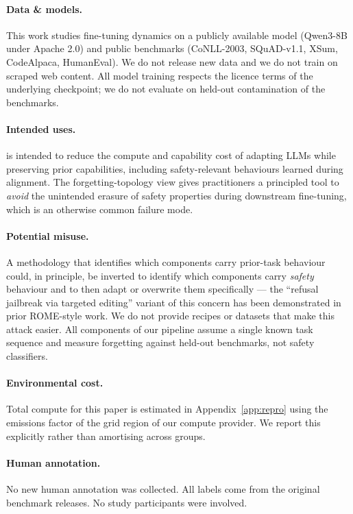 \paragraph{Data \& models.} This work studies fine-tuning dynamics on a publicly available model (Qwen3-8B under Apache 2.0) and public benchmarks (CoNLL-2003, SQuAD-v1.1, XSum, CodeAlpaca, HumanEval). We do not release new data and we do not train on scraped web content. All model training respects the licence terms of the underlying checkpoint; we do not evaluate on held-out contamination of the benchmarks.

\paragraph{Intended uses.} \tglora{} is intended to reduce the compute and capability cost of adapting LLMs while preserving prior capabilities, including safety-relevant behaviours learned during alignment. The forgetting-topology view gives practitioners a principled tool to \textit{avoid} the unintended erasure of safety properties during downstream fine-tuning, which is an otherwise common failure mode.

\paragraph{Potential misuse.} A methodology that identifies which components carry prior-task behaviour could, in principle, be inverted to identify which components carry \textit{safety} behaviour and to then adapt or overwrite them specifically --- the ``refusal jailbreak via targeted editing'' variant of this concern has been demonstrated in prior ROME-style work. We do not provide recipes or datasets that make this attack easier. All components of our pipeline assume a single known task sequence and measure forgetting against held-out benchmarks, not safety classifiers.

\paragraph{Environmental cost.} Total compute for this paper is estimated in Appendix~\ref{app:repro} using the emissions factor of the grid region of our compute provider. We report this explicitly rather than amortising across groups.

\paragraph{Human annotation.} No new human annotation was collected. All labels come from the original benchmark releases. No study participants were involved.
